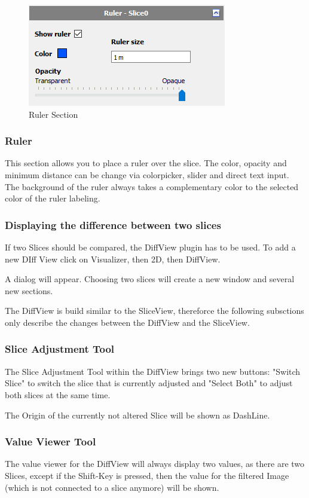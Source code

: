 \begin{figure}[h!]
  \centering
  \includegraphics[scale=1.0]{img/2d/ruler}
  \caption{Ruler Section}
\end{figure}  

\subsubsection{Ruler}

This section allows you to place a ruler over the slice. The color, opacity and minimum distance can be change via colorpicker, slider and direct text input. The background of the ruler always takes a complementary color to the selected color of the ruler labeling.
 
\subsubsection{Displaying the difference between two slices}

If two Slices should be compared, the DiffView plugin has to be used. To add a new DIff View click on Visualizer, then 2D, then DiffView.

A dialog will appear. Choosing two slices will create a new window and several new sections.

The DiffView is build similar to the SliceView, thereforce the following subsctions only describe the changes between the DiffView and the SliceView.


\subsubsection{Slice Adjustment Tool}

The Slice Adjustment Tool within the DiffView brings two new buttons: "Switch Slice" to switch the slice that is currently adjusted and "Select Both" to adjust both slices at the same time.

The Origin of the currently not altered Slice will be shown as DashLine. 

\subsubsection{Value Viewer Tool}
The value viewer for the DiffView will always display two values, as there are two Slices, except if the Shift-Key is pressed, then the value for the filtered Image (which is not connected to a slice anymore) will be shown.
